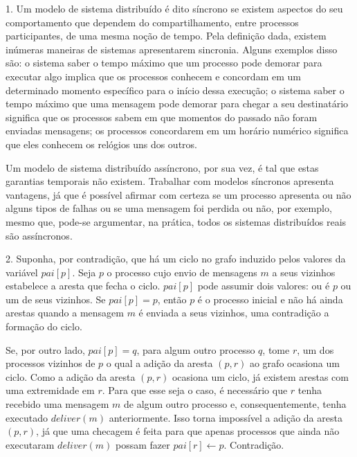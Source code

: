\documentclass[a4paper]{article}
\title{}
\author{Universidade Federal da Bahia \\ MATA88 - Fundamentos de Sistemas Distribuídos \\ Prof. Flávio Assis \\ \begingroup
  \fontsize{10pt}{12pt}\selectfont
  Semestre 2017.2 - 3 de Fevereiro de 2018
\endgroup}
\date{Lista de Exercícios \\ \begingroup
  \fontsize{10pt}{12pt}\selectfont
  Bruno Guilera, Gabriel Dahia, Pedro Vidal
\endgroup}
\begin{document}
 
\maketitle
\vspace{-15pt}
 
1. Um modelo de sistema distribuído é dito síncrono se existem aspectos do seu comportamento que dependem do compartilhamento, entre processos participantes, de uma mesma noção de tempo.
Pela definição dada, existem inúmeras maneiras de sistemas apresentarem sincronia.
Alguns exemplos disso são: o sistema saber o tempo máximo que um processo pode demorar para executar algo implica que os processos conhecem e concordam em um determinado momento específico para o início dessa execução; o sistema saber o tempo máximo que uma mensagem pode demorar para chegar a seu destinatário significa que os processos sabem em que momentos do passado não foram enviadas mensagens; os processos concordarem em um horário numérico significa que eles conhecem os relógios uns dos outros.

Um modelo de sistema distribuído assíncrono, por sua vez, é tal que estas garantias temporais não existem. Trabalhar com modelos síncronos apresenta vantagens, já que é possível afirmar com certeza se um processo apresenta ou não alguns tipos de falhas ou se uma mensagem foi perdida ou não, por exemplo, mesmo que, pode-se argumentar, na prática, todos os sistemas distribuídos reais são assíncronos.

\bigskip

2. Suponha, por contradição, que há um ciclo no grafo induzido pelos valores da variável $pai[p]$.
Seja $p$ o processo cujo envio de mensagens $m$ a seus vizinhos estabelece a aresta que fecha o ciclo.
$pai[p]$ pode assumir dois valores: ou é $p$ ou um de seus vizinhos.
Se $pai[p] = p$, então $p$ é o processo inicial e não há ainda arestas quando a mensagem $m$ é enviada a seus vizinhos, uma contradição a formação do ciclo.

Se, por outro lado, $pai[p] = q$, para algum outro processo $q$, tome $r$, um dos processos vizinhos de $p$ o qual a adição da aresta $(p, r)$ ao grafo ocasiona um ciclo.
Como a adição da aresta $(p, r)$ ocasiona um ciclo, já existem arestas com uma extremidade em $r$.
Para que esse seja o caso, é necessário que $r$ tenha recebido uma mensagem $m$ de algum outro processo e, consequentemente, tenha executado $deliver(m)$ anteriormente.
Isso torna impossível a adição da aresta $(p, r)$, já que uma checagem é feita para que apenas processos que ainda não executaram $deliver(m)$ possam fazer $pai[r] \leftarrow p$.
Contradição.
\end{document}

